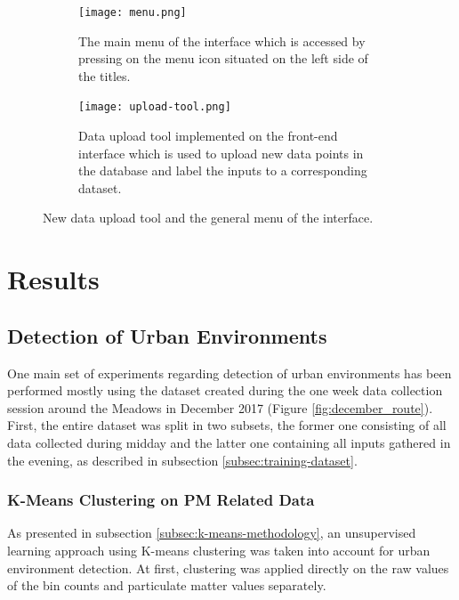 \documentclass[bsc,frontabs,twoside,singlespacing, parskip,deptreport]{infthesis}     %
\begin{document}
\begin{figure}[h!]
  \begin{subfigure}[t]{\textwidth}
    \texttt{[image: menu.png]}
    \caption{The main menu of the interface which is accessed by pressing on the menu icon situated on the left side of the titles.}
    \label{fig:menu}
  \end{subfigure}
  \hfill
  \begin{subfigure}[t]{\textwidth}
    \texttt{[image: upload-tool.png]}
    \caption{Data upload tool implemented on the front-end interface which is used to upload new data points in the database and label the inputs to a corresponding dataset.}
    \label{fig:upload-tool}
  \end{subfigure}
  \caption{New data upload tool and the general menu of the interface.}
  \label{fig:upload-tool-and-menu}
\end{figure}


\chapter{Results}

\section{Detection of Urban Environments}
\label{sec:urban-environments-results}

One main set of experiments regarding detection of urban environments has been performed mostly using the dataset created during the one week data collection session around the Meadows in December 2017 (Figure \ref{fig:december_route}). First, the entire dataset was split in two subsets, the former one consisting of all data collected during midday and the latter one containing all inputs gathered in the evening, as described in subsection \ref{subsec:training-dataset}.

\subsection{K-Means Clustering on PM Related Data}
\label{subsec:k-means-straight-results}

As presented in subsection \ref{subsec:k-means-methodology}, an unsupervised learning approach using K-means clustering was taken into account for urban environment detection. At first, clustering was applied directly on the raw values of the bin counts and particulate matter values separately.
\end{document}

